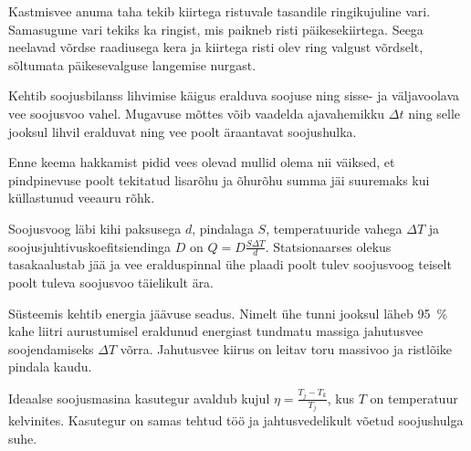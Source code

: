 \documentclass[10pt, twoside]{article}
\begin{document}
{
\hint
Kastmisvee anuma taha tekib kiirtega ristuvale tasandile ringikujuline vari. Samasugune vari tekiks ka ringist, mis paikneb risti päikesekiirtega. Seega neelavad võrdse raadiusega kera ja kiirtega risti olev ring valgust võrdselt, sõltumata päikesevalguse langemise nurgast.
\probend
\bigskip


\hint
Kehtib soojusbilanss lihvimise käigus eralduva soojuse ning sisse- ja väljavoolava vee soojusvoo vahel. Mugavuse mõttes võib vaadelda ajavahemikku $\Delta t$ ning selle jooksul lihvil eralduvat ning vee poolt äraantavat soojushulka.
\probend
\bigskip


\hint
Enne keema hakkamist pidid vees olevad mullid olema nii väiksed, et pindpinevuse poolt tekitatud lisarõhu ja õhurõhu summa jäi suuremaks kui küllastunud veeauru rõhk.
\probend
\bigskip


\hint
Soojusvoog läbi kihi paksusega $d$, pindalaga $S$, temperatuuride vahega $\Delta T$ ja soojusjuhtivuskoefitsiendinga $D$ on $Q = D\frac{S\Delta T}{d}$. Statsionaarses olekus tasakaalustab jää ja vee eralduspinnal ühe plaadi poolt tulev soojusvoog teiselt poolt tuleva soojusvoo täielikult ära.
\probend
\bigskip


\hint
Süsteemis kehtib energia jäävuse seadus. Nimelt ühe tunni jooksul läheb \SI{95}{\%} kahe liitri aurustumisel eraldunud energiast tundmatu massiga jahutusvee soojendamiseks $\Delta T$ võrra. Jahutusvee kiirus on leitav toru massivoo ja ristlõike pindala kaudu.
\probend
\bigskip


\hint
Ideaalse soojusmasina kasutegur avaldub kujul $\eta = \frac{T_{j} - T_{k}}{T_{j}}$, kus $T$ on temperatuur kelvinites. Kasutegur on samas tehtud töö ja jahtusvedelikult võetud soojushulga suhe.
\probend
\bigskip

}
\end{document}
